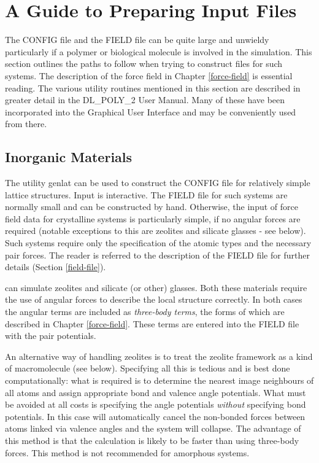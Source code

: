 \section{A Guide to Preparing Input Files}

The CONFIG file and the FIELD file can be quite large and unwieldy
particularly if a polymer or biological molecule is involved in the
simulation.  This section outlines the paths to follow when trying
to construct files for such systems.  The description of the \D
force field in Chapter \ref{force-field} is essential reading.  The
various utility routines mentioned in this section are described in
greater detail in the DL\_POLY\_2 User Manual.  Many of these
have been incorporated into the \D Graphical User
Interface \cite{smith-gui} and may
be conveniently used from there.

\subsection {Inorganic Materials}

The utility {\sc genlat} can be used to construct the CONFIG file
for relatively simple lattice structures.  Input is interactive. The
FIELD file for such systems are normally small and can be
constructed by hand.  Otherwise, the input of force field data for
crystalline systems is particularly simple, if no angular forces are
required (notable exceptions to this are zeolites and silicate
glasses - see below).  Such systems require only the specification
of the atomic types and the necessary pair forces.  The reader is
referred to the description of the \D FIELD file for further details
(Section \ref{field-file}).

\D can simulate zeolites and silicate (or other) glasses.  Both
these materials require the use of angular forces to describe the
local structure correctly.  In both cases the angular terms are
included as {\em three-body terms}, the forms of which are described
in Chapter \ref{force-field}.  These terms are entered into the
FIELD file with the pair potentials.

An alternative way of handling zeolites is to treat the zeolite
framework as a kind of macromolecule (see below).  Specifying all
this is tedious and is best done computationally: what is required
is to determine the nearest image neighbours of all atoms and assign
appropriate bond and valence angle potentials.  What must be avoided
at all costs is specifying the angle potentials {\em without}
specifying bond potentials.  In this case \D
will automatically cancel the non-bonded
forces between atoms linked via valence
angles and the system will collapse.
The advantage of this method is that the calculation is likely to be
faster than using three-body forces.
This method is not recommended for amorphous systems.

